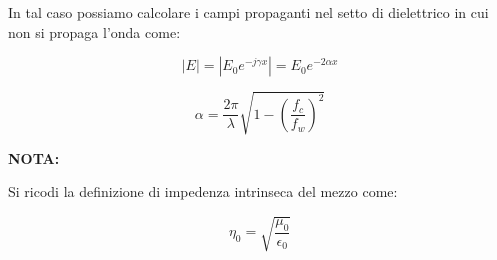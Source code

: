 		In tal caso possiamo calcolare i campi propaganti nel setto di dielettrico in cui non si propaga l'onda come:


		\begin{equation}
		|E|=|E_0 e^{-j\gamma x}|=E_0 e^{- 2 \alpha x}
		\end{equation}


		\begin{equation}
		\alpha=\frac{2 \pi}{\lambda}\sqrt{1-(\frac{f_c}{f_w})^2}
		\end{equation}


		\textbf{NOTA:}

		Si ricodi la definizione di impedenza intrinseca del mezzo come:


		\begin{equation}
		\eta_0 = \sqrt{\frac{\mu_0}{\epsilon_0}} 
		\end{equation}
